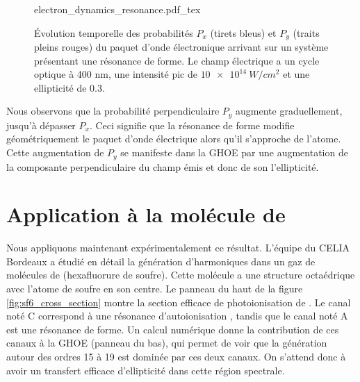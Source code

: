 \begin{figure}[!ht]
\centering
\def\svgwidth{1\columnwidth}
{electron_dynamics_resonance.pdf_tex}
\caption{\'{E}volution temporelle des probabilités $P_x$ (tirets bleus) et $P_y$ (traits pleins rouges) du paquet d'onde électronique arrivant sur un système présentant une résonance de forme. Le champ électrique a un cycle optique à 400 nm, une intensité pic de $\SI{10e14}{W/cm^2}$ et une ellipticité de 0.3.}
\label{fig:resonant_proba}
\end{figure}

Nous observons que la probabilité perpendiculaire $P_y$ augmente graduellement, jusqu'à dépasser $P_x$. Ceci signifie que la résonance de forme modifie géométriquement le paquet d'onde électrique alors qu'il s'approche de l'atome. Cette augmentation de $P_y$ se manifeste dans la GHOE par une augmentation de la composante perpendiculaire du champ émis et donc de son l'ellipticité.

\section{Application à la molécule de }
\label{sec:sf6ghoe}
Nous appliquons maintenant expérimentalement ce résultat. L'équipe du CELIA Bordeaux a étudié en détail la génération d'harmoniques dans un gaz de molécules de  (hexafluorure de soufre). Cette molécule a une structure octaédrique avec l'atome de soufre en son centre. Le panneau du haut de la figure \ref{fig:sf6_cross_section} montre la section efficace de photoionisation de . Le canal noté C correspond à une résonance d'autoionisation , tandis que le canal noté A est une résonance de forme. Un calcul numérique donne la contribution de ces canaux à la GHOE (panneau du bas), qui permet de voir que la génération autour des ordres 15 à 19 est dominée par ces deux canaux. On s'attend donc à avoir un transfert efficace d'ellipticité dans cette région spectrale.

